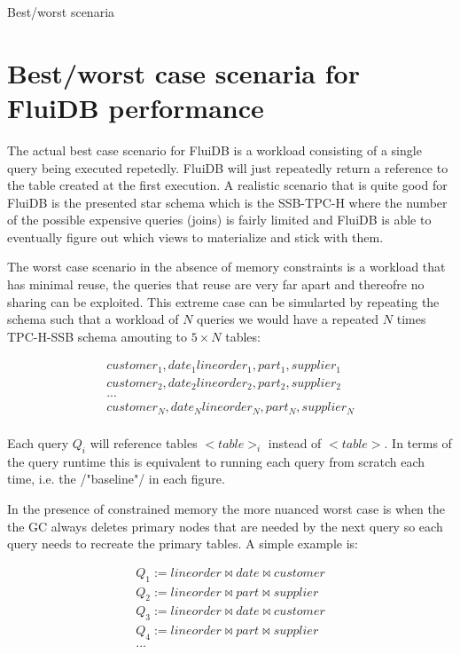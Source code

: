 \begin{corrected}{Best/worst scenaria}
  \section{Best/worst case scenaria for FluiDB performance}

  The actual best case scenario for FluiDB is a workload consisting of
  a single query being executed repetedly. FluiDB will just repeatedly
  return a reference to the table created at the first execution. A
  realistic scenario that is quite good for FluiDB is the presented
  star schema which is the SSB-TPC-H where the number of the possible
  expensive queries (joins) is fairly limited and FluiDB is able to
  eventually figure out which views to materialize and stick with
  them.

  The worst case scenario in the absence of memory constraints is a
  workload that has minimal reuse, the queries that reuse are very far
  apart and thereofre no sharing can be exploited. This extreme case
  can be simularted by repeating the schema such that a workload of
  \(N\) queries we would have a repeated \(N\) times TPC-H-SSB schema
  amouting to \(5 \times N\) tables:


  \begin{align*}
    customer_1, date_1 lineorder_1, part_1, supplier_1 \\
    customer_2, date_2 lineorder_2, part_2, supplier_2 \\
    ... \\
    customer_N, date_N lineorder_N, part_N, supplier_N \\
  \end{align*}

  Each query \(Q_i\) will reference tables \(<table>_i\) instead of
  \(<table>\). In terms of the query runtime this is equivalent to
  running each query from scratch each time, i.e. the /"baseline"/ in
  each figure.

  In the presence of constrained memory the more nuanced worst case is
  when the the GC always deletes primary nodes that are needed by the
  next query so each query needs to recreate the primary tables. A
  simple example is:


  \begin{align*}
    Q_1 := lineorder \Join date \Join customer \\
    Q_2 := lineorder \Join part \Join supplier \\
    Q_3 := lineorder \Join date \Join customer \\
    Q_4 := lineorder \Join part \Join supplier \\
    ...
  \end{align*}


\end{corrected}
